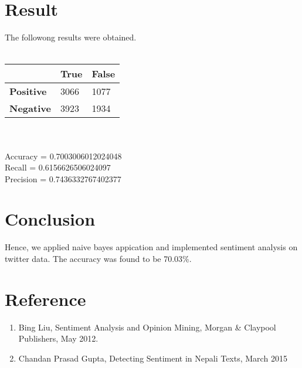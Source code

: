 \documentclass[12pt]{article}
\begin{document}
\section{Result}
The followong results were obtained.\\\\
\begin{tabular}{|l|l|l|}
\hline
& \textbf{True} &\textbf{False}\\
\hline
\textbf{Positive} & 3066 & 1077\\
\hline
\textbf{Negative} & 3923 & 1934\\
\hline
\end{tabular}
\\\\
Accuracy = 0.7003006012024048\\
Recall = 0.6156626506024097\\
Precision = 0.7436332767402377

\section{Conclusion}
Hence, we applied naive bayes appication and implemented sentiment analysis on twitter data. The accuracy was found to be 70.03\%.

\section{Reference}

\begin{enumerate}
\item Bing Liu, Sentiment Analysis and Opinion Mining, Morgan \& Claypool Publishers, May 2012.
\item Chandan Prasad Gupta, Detecting Sentiment in Nepali Texts, March 2015
\end{enumerate}
\end{document}
